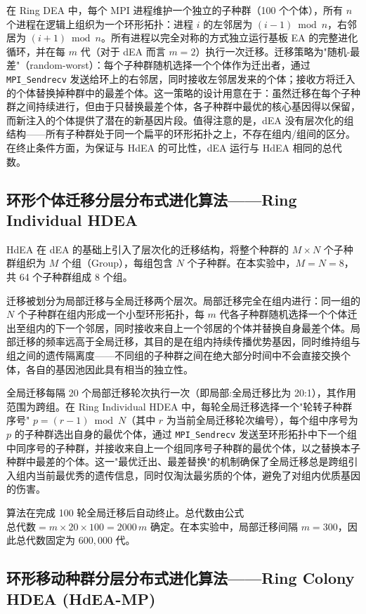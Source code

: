 在 Ring DEA 中，每个 MPI 进程维护一个独立的子种群（100 个个体），所有 $n$ 个进程在逻辑上组织为一个环形拓扑：进程 $i$ 的左邻居为 $(i-1)\bmod n$，右邻居为 $(i+1)\bmod n$。所有进程以完全对称的方式独立运行基板 EA 的完整进化循环，并在每 $m$ 代（对于 dEA 而言 $m = 2$）执行一次迁移。迁移策略为"随机-最差"（random-worst）：每个子种群随机选择一个个体作为迁出者，通过 \texttt{MPI\_Sendrecv} 发送给环上的右邻居，同时接收左邻居发来的个体；接收方将迁入的个体替换掉种群中的最差个体。这一策略的设计用意在于：虽然迁移在每个子种群之间持续进行，但由于只替换最差个体，各子种群中最优的核心基因得以保留，而新注入的个体提供了潜在的新基因片段。值得注意的是，dEA 没有层次化的组结构——所有子种群处于同一个扁平的环形拓扑之上，不存在组内/组间的区分。在终止条件方面，为保证与 HdEA 的可比性，dEA 运行与 HdEA 相同的总代数。

\subsection{环形个体迁移分层分布式进化算法——Ring Individual HDEA}

HdEA 在 dEA 的基础上引入了层次化的迁移结构，将整个种群的 $M \times N$ 个子种群组织为 $M$ 个组（Group），每组包含 $N$ 个子种群。在本实验中，$M = N = 8$，共 64 个子种群组成 8 个组。

迁移被划分为局部迁移与全局迁移两个层次。局部迁移完全在组内进行：同一组的 $N$ 个子种群在组内形成一个小型环形拓扑，每 $m$ 代各子种群随机选择一个个体迁出至组内的下一个邻居，同时接收来自上一个邻居的个体并替换自身最差个体。局部迁移的频率远高于全局迁移，其目的是在组内持续传播优势基因，同时维持组与组之间的遗传隔离度——不同组的子种群之间在绝大部分时间中不会直接交换个体，各自的基因池因此具有相当的独立性。

全局迁移每隔 20 个局部迁移轮次执行一次（即局部:全局迁移比为 20:1），其作用范围为跨组。在 Ring Individual HDEA 中，每轮全局迁移选择一个"轮转子种群序号" $p = (r-1) \bmod N$（其中 $r$ 为当前全局迁移轮次编号），每个组中序号为 $p$ 的子种群选出自身的最优个体，通过 \texttt{MPI\_Sendrecv} 发送至环形拓扑中下一个组中同序号的子种群，并接收来自上一个组同序号子种群的最优个体，以之替换本子种群中最差的个体。这一"最优迁出、最差替换"的机制确保了全局迁移总是跨组引入组内当前最优秀的遗传信息，同时仅淘汰最劣质的个体，避免了对组内优质基因的伤害。

算法在完成 100 轮全局迁移后自动终止。总代数由公式 $\text{总代数} = m \times 20 \times 100 = 2000\,m$ 确定。在本实验中，局部迁移间隔 $m = 300$，因此总代数固定为 $600,000$ 代。

\subsection{环形移动种群分层分布式进化算法——Ring Colony HDEA (HdEA-MP)}

